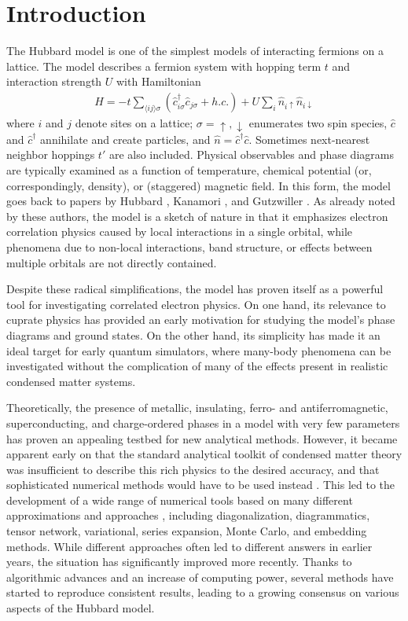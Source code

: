 \documentclass{ar-1col}
\begin{document}
\section{Introduction}
\label{sec:introduction}
The Hubbard model is one of the simplest models of interacting fermions on a lattice. The model describes a fermion system with hopping term $t$ and interaction strength $U$ with Hamiltonian
\begin{align}
H = -t \sum_{\langle ij\rangle\sigma} \left(\hat c_{i\sigma}^\dagger \hat c_{j\sigma} + h.c.\right) +U \sum_i \hat n_{i\uparrow} \hat n_{i\downarrow}
\end{align}
where $i$ and $j$ denote sites on a lattice; $\sigma=\uparrow,\downarrow$ enumerates two spin species, $\hat c$ and $\hat c^\dagger$ annihilate and create particles, and $\hat n=\hat c^\dagger \hat c$. Sometimes next-nearest neighbor hoppings $t'$ are also included. Physical observables and phase diagrams are typically examined as a function of temperature, chemical potential (or, correspondingly, density), or (staggered) magnetic field.
In this form, the model goes back to papers by Hubbard \cite{Hubbard63}, Kanamori \cite{Kanamori63}, and Gutzwiller \cite{Gutzwiller63}. As already noted by these authors, the model is a sketch of nature in that it emphasizes electron correlation physics caused by local interactions in a single orbital, while phenomena due to non-local interactions, band structure, or effects between multiple orbitals are not directly contained.

Despite these radical simplifications, the model has proven itself as a powerful tool for investigating correlated electron physics. On one hand, its relevance to cuprate physics has provided an early motivation for studying the model's phase diagrams and ground states. On the other hand, its simplicity has made it an ideal target for early quantum simulators, where many-body phenomena can be investigated without the complication of many of the effects present in realistic condensed matter systems.
 
Theoretically, the presence of metallic, insulating, ferro- and antiferromagnetic, superconducting, and charge-ordered phases in a model with very few parameters has proven an appealing testbed for new analytical methods. However, it became apparent early on that the standard analytical toolkit of condensed matter theory was insufficient to describe this rich physics to the desired accuracy, and that sophisticated numerical methods would have to be used instead \cite{Gull15}. This led to the development of a wide range of numerical tools based on many different approximations and approaches \cite{LeBlanc15,Schaefer21A}, including diagonalization, diagrammatics, tensor network, variational, series expansion, 
Monte Carlo, and embedding methods. 
While different approaches often led to different answers in earlier years, the situation has significantly improved more recently. Thanks to algorithmic advances and an increase of computing power, several methods have started to reproduce consistent results, leading to  a growing consensus on various aspects of the Hubbard model.
 
\end{document}
